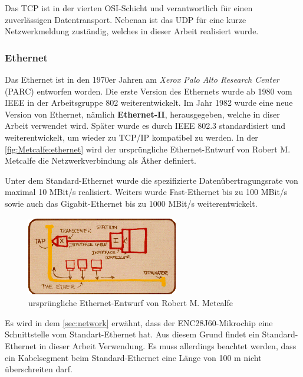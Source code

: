 Das TCP ist in der vierten OSI-Schicht und verantwortlich für einen zuverlässigen Datentransport. Nebenan ist das UDP für eine kurze Netzwerkmeldung zuständig, welches in dieser Arbeit realisiert wurde. 


\subsubsection{Ethernet}

Das Ethernet ist in den 1970er Jahren am \textit{Xerox Palo Alto Research Center} (PARC) entworfen worden. Die erste Version des Ethernets wurde ab 1980 vom IEEE in der Arbeitsgruppe 802 weiterentwickelt. Im Jahr 1982 wurde eine neue Version von Ethernet, nämlich \textbf{Ethernet-II}, herausgegeben, welche in diser Arbeit verwendet wird. Später wurde es durch IEEE 802.3 standardisiert und weiterentwickelt, um wieder zu TCP/IP kompatibel zu werden. In der \autoref{fig:Metcalfe:ethernet} wird der ursprüngliche Ethernet-Entwurf von Robert M. Metcalfe die Netzwerkverbindung als Äther definiert. \smallskip \smallskip

Unter dem Standard-Ethernet wurde die spezifizierte Datenübertragungsrate von maximal 10 MBit/s realisiert. Weiters wurde Fast-Ethernet bis zu 100 MBit/s sowie auch das Gigabit-Ethernet bis zu 1000 MBit/s weiterentwickelt. \smallskip \smallskip

\begin{figure}[htbp]
	\centering
		\includegraphics[width=250px,height=130px]{pictures/ethernet73.png}
	\caption[Ursprüngliche Ethernet-Entwurf von Robert M. Metcalfe]{ursprüngliche Ethernet-Entwurf von Robert M. Metcalfe \cite{IEEE:802.3}}\label{fig:Metcalfe:ethernet}
\end{figure}

Es wird in dem \autoref{sec:network} erwähnt, dass der ENC28J60-Mikrochip eine Schnittstelle vom Standart-Ethernet hat. Aus diesem Grund findet ein Standard-Ethernet in dieser Arbeit Verwendung. Es muss allerdings beachtet werden, dass ein Kabelsegment beim Standard-Ethernet eine Länge von 100 m nicht überschreiten darf. \smallskip \smallskip

